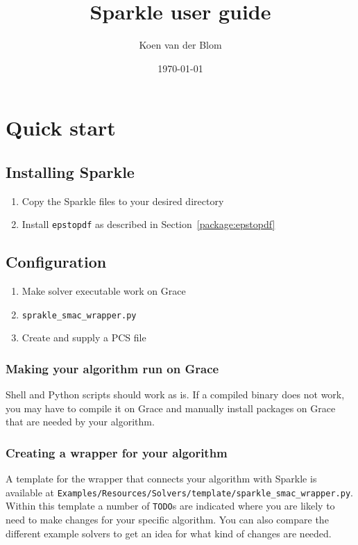 \documentclass{article}
\title{Sparkle user guide}
\author{Koen van der Blom}
\date{\today}
\begin{document}
\maketitle

\section{Quick start}

\subsection{Installing Sparkle}

\begin{enumerate}
  \item Copy the Sparkle files to your desired directory
  \item Install \texttt{epstopdf} as described in Section~\ref{package:epstopdf}
\end{enumerate}

\subsection{Configuration}

\begin{enumerate}
  \item Make solver executable work on Grace
  \item \texttt{sprakle\_smac\_wrapper.py}
  \item Create and supply a PCS file
\end{enumerate}

\subsubsection{Making your algorithm run on Grace}
Shell and Python scripts should work as is. If a compiled binary does not work, you may have to compile it on Grace and manually install packages on Grace that are needed by your algorithm.

\subsubsection{Creating a wrapper for your algorithm}
A template for the wrapper that connects your algorithm with Sparkle is available at \texttt{Examples/Resources/Solvers/template/sparkle\_smac\_wrapper.py}. Within this template a number of \texttt{TODO}s are indicated where you are likely to need to make changes for your specific algorithm. You can also compare the different example solvers to get an idea for what kind of changes are needed.
\end{document}
